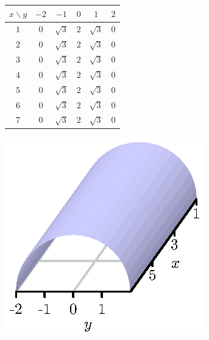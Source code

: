 \begin{activity}
  \begin{figure}[ht]
    \begin{center}
      \begin{minipage}{2.5in}
        \begin{center}
          \begin{tabular}{|c||c|c|c|c|c|} \hline
            $x\backslash y$ &$-2$   &$-1$  &$0$    &$1$
            &$2$ \\ 
            \hline 
            \hline 
            $1$ &$0$ &$\sqrt{3}$ &$2$ &$\sqrt{3}$ &$0$ \\ \hline
            $2$ &$0$ &$\sqrt{3}$ &$2$ &$\sqrt{3}$ &$0$ \\ \hline
            $3$ &$0$ &$\sqrt{3}$ &$2$ &$\sqrt{3}$ &$0$ \\ \hline
            $4$ &$0$ &$\sqrt{3}$ &$2$ &$\sqrt{3}$ &$0$ \\ \hline
            $5$ &$0$ &$\sqrt{3}$ &$2$ &$\sqrt{3}$ &$0$ \\ \hline
            $6$ &$0$ &$\sqrt{3}$ &$2$ &$\sqrt{3}$ &$0$ \\ \hline
            $7$ &$0$ &$\sqrt{3}$ &$2$ &$\sqrt{3}$ &$0$ \\ \hline
          \end{tabular}
        \end{center}
        \label{DI:11.1.TOV}
      \end{minipage} \hspace{0.5in}
      \begin{minipage}{2.5in}
        \begin{center}
          \includegraphics{figures/fig_11_1_cylinder.eps}
        \end{center}
        \label{F:11.1.DI_example}
      \end{minipage}
    \end{center}
  \end{figure}


\end{activity}
